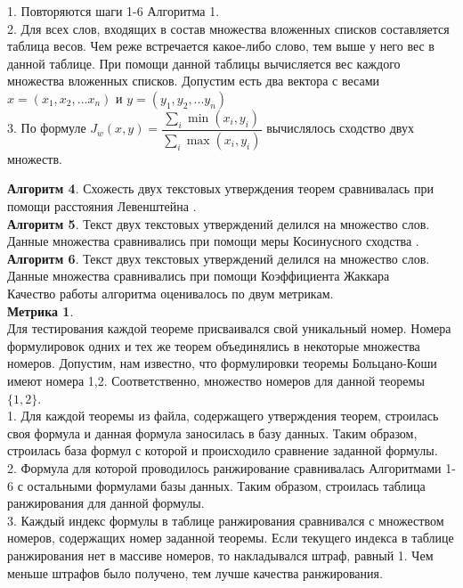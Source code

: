 \documentclass[12pt]{article}
\begin{document}
1. Повторяются шаги 1-6 Алгоритма 1. \\

2. Для всех слов, входящих в состав множества вложенных списков составляется таблица весов. Чем реже встречается какое-либо слово, тем выше у него вес в данной таблице. При  помощи данной таблицы вычисляется вес каждого множества вложенных списков. Допустим есть два вектора с весами $x=(x_1,x_2,...x_n)$ и  $y=(y_1,y_2,...y_n)$ \\

3. По формуле $J_w(x,y)=\dfrac{\sum_{i} \min(x_i,y_i)}{\sum _{i} \max(x_i,y_i)}$ вычислялось сходство двух множеств.

\textbf{Алгоритм 4}. Схожесть двух текстовых утверждения теорем сравнивалась при помощи расстояния Левенштейна . \\

\textbf{Алгоритм 5}. Текст двух текстовых утверждений делился на множество слов. Данные множества сравнивались  при помощи меры Косинусного сходства . \\

\textbf{Алгоритм 6}. Текст двух текстовых утверждений делился на множество слов. Данные множества сравнивались  при помощи Коэффициента Жаккара \\

Качество работы алгоритма оценивалось по двум метрикам. \\

\textbf{Метрика 1}.\\

Для тестирования каждой теореме присваивался свой уникальный номер. Номера формулировок одних и тех же теорем объединялись в некоторые множества номеров. Допустим, нам известно, что формулировки теоремы Больцано-Коши имеют номера 1,2. Соответственно, множество номеров для данной теоремы $\{1,2\}$.\\

1. Для каждой теоремы из файла, содержащего утверждения теорем, строилась своя формула и данная формула заносилась в базу данных. Таким образом, строилась база формул с которой и происходило сравнение заданной формулы.\\

2. Формула для которой проводилось ранжирование сравнивалась Алгоритмами 1-6  с остальными формулами базы данных. Таким образом, строилась таблица ранжирования для данной формулы.\\

3. Каждый индекс формулы в таблице ранжирования сравнивался с множеством номеров, содержащих номер заданной теоремы. Если текущего индекса в таблице ранжирования нет в массиве номеров, то накладывался штраф, равный 1. Чем меньше штрафов было получено, тем лучше качества ранжирования.\\
\end{document}
